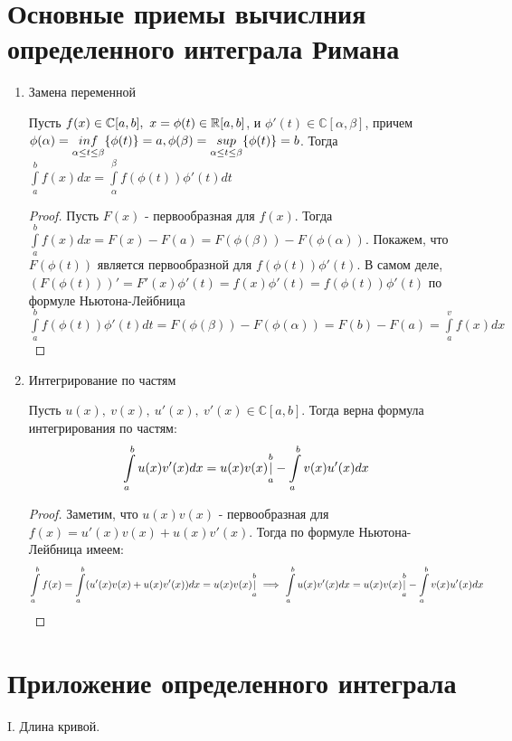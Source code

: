 \section{Основные приемы вычислния определенного интеграла Римана}
\begin{enumerate}
\item Замена переменной
\begin{theor} Пусть $f(x)\in\mathbb{C}[a,b],\ x=\phi(t)\in\R[a,b]$, и $\phi'(t)\in\mathbb{C}[\alpha,\beta]$, причем $\phi(\alpha)=\underset{\alpha\leq t\leq\beta}{inf}\{\phi(t)\}=a,\newline\phi(\beta)=\underset{\alpha\leq t\leq\beta}{sup}\{\phi(t)\}=b$. Тогда $\int\limits^b_af(x)dx=\int\limits^\beta_\alpha f(\phi(t))\phi'(t)dt$
\end{theor}
\begin{proof}
Пусть $F(x)$ - первообразная для $f(x)$. Тогда $\int\limits^b_af(x)dx=F(x)-F(a)=F(\phi(\beta))-F(\phi(\alpha))$. Покажем, что $F(\phi(t))$ является первообразной для $f(\phi(t))\phi'(t)$. В самом деле, $(F(\phi(t)))'=F'(x)\phi'(t)=f(x)\phi'(t)=f(\phi(t))\phi'(t)$ \then по формуле Ньютона-Лейбница $\int\limits^b_af(\phi(t))\phi'(t)dt=F(\phi(\beta))-F(\phi(\alpha))=F(b)-F(a)=\int\limits^v_af(x)dx$
\end{proof}
\item Интегрирование по частям
\begin{theor} Пусть $u(x),\ v(x),\ u'(x),\ v'(x)\in\mathbb{C}[a,b]$. Тогда верна формула интегрирования по частям:
$$
\int\limits^b_au(x)v'(x)dx=u(x)v(x)\underset{a}{\overset{b}{|}}-\int\limits^b_av(x)u'(x)dx
$$
\end{theor}
\begin{proof}
Заметим, что $u(x)v(x)$ - первообразная для $f(x)=u'(x)v(x)+u(x)v'(x)$. Тогда по формуле Ньютона-Лейбница имеем:
$$
\int\limits^b_af(x)=\int\limits^b_a(u'(x)v(x)+u(x)v'(x))dx=u(x)v(x)\underset{a}{\overset{b}{|}}\ \Longrightarrow\ \int\limits^b_au(x)v'(x)dx=u(x)v(x)\underset{a}{\overset{b}{|}}-\int\limits^b_av(x)u'(x)dx
$$
\end{proof}
\end{enumerate}
\section{Приложение определенного интеграла}
I. Длина кривой.

